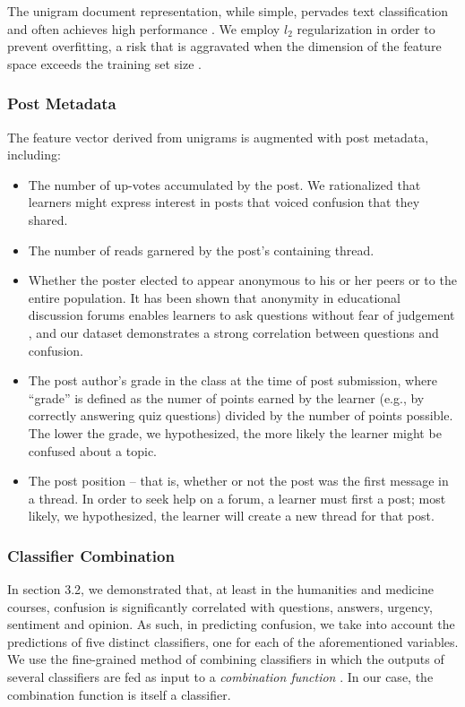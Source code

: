 \documentclass{edm_template}
\begin{document}
The unigram document representation, while simple, pervades text classification and often achieves high performance \cite{boulis2005text}. We employ $l_{2}$ regularization in order to prevent overfitting, a risk that is aggravated when the dimension of the feature space exceeds the training set size \cite{Ng:2004:FSL:1015330.1015435}.

\subsubsection{Post Metadata}
The feature vector derived from unigrams is augmented with post metadata, including: 
\vspace{-15pt}
\begin{itemize}
\setlength\itemsep{0.05em}
       \item The number of up-votes accumulated by the post. We rationalized that learners might express interest in posts that voiced confusion that they shared. 
       \item The number of reads garnered by the post's containing thread.
       \item Whether the poster elected to appear anonymous to his or her peers or to the entire population. It has been shown that anonymity in educational discussion forums enables learners to ask questions without fear of judgement \cite{freeman2004student}, and our dataset demonstrates a strong correlation between questions and confusion.
       \item The post author's grade in the class at the time of post submission, where ``grade'' is defined as the numer of points earned by the learner (e.g., by correctly answering quiz questions) divided by the number of points possible. The lower the grade, we hypothesized, the more likely the learner might be confused about a topic.
       \item The post position -- that is, whether or not the post was the first message in a thread. In order to seek help on a forum, a learner must first a post; most likely, we hypothesized, the learner will create a new thread for that post.
\end{itemize}

\subsubsection{Classifier Combination}
In section 3.2, we demonstrated that, at least in the humanities and medicine courses, confusion is significantly correlated with questions, answers, urgency, sentiment and opinion. As such, in predicting confusion, we take into account the predictions of five distinct classifiers, one for each of the aforementioned variables. We use the fine-grained method of combining classifiers in which the outputs of several classifiers are fed as input to a \emph{combination function} \cite{bennett2005combination}. In our case, the combination function is itself a classifier.
\end{document}
